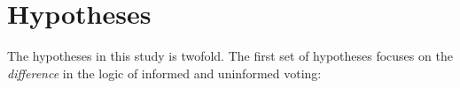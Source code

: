 \documentclass[doc,natbib,12pt]{apa6}\usepackage[]{graphicx}\usepackage[]{color}
\begin{document}
    
    
    
    \section{Hypotheses}
    
    \par The hypotheses in this study is twofold. The first set of hypotheses focuses on the \textit{difference} in the logic of informed and uninformed voting: 
    
\end{document}
